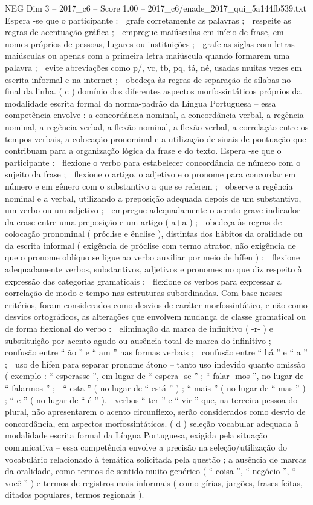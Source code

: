 \begin{textsample}{NEG Dim 3 – 2017\_c6 – Score 1.00 – 2017\_c6/enade\_2017\_qui\_5a144fb539.txt}
Espera -se que o participante :  grafe corretamente as palavras ;  respeite as regras de acentuação gráfica ;  empregue maiúsculas em início de frase, em nomes próprios de pessoas, lugares ou instituições ;  grafe as siglas com letras maiúsculas ou apenas com a primeira letra maiúscula quando formarem uma palavra ;  evite abreviações como p/, vc, tb, pq, tá, né, usadas muitas vezes em escrita informal e na internet ;  obedeça às regras de separação de sílabas no final da linha. ( c ) domínio dos diferentes aspectos morfossintáticos próprios da modalidade escrita formal da norma-padrão da Língua Portuguesa – essa competência envolve : a concordância nominal, a concordância verbal, a regência nominal, a regência verbal, a flexão nominal, a flexão verbal, a correlação entre os tempos verbais, a colocação pronominal e a utilização de sinais de pontuação que contribuam para a organização lógica da frase e do texto.
Espera -se que o participante :  flexione o verbo para estabelecer concordância de número com o sujeito da frase ;  flexione o artigo, o adjetivo e o pronome para concordar em número e em gênero com o substantivo a que se referem ;  observe a regência nominal e a verbal, utilizando a preposição adequada depois de um substantivo, um verbo ou um adjetivo ;  empregue adequadamente o acento grave indicador da crase entre uma preposição e um artigo ( a+a ) ;  obedeça às regras de colocação pronominal ( próclise e ênclise ), distintas dos hábitos da oralidade ou da escrita informal ( exigência de próclise com termo atrator, não exigência de que o pronome oblíquo se ligue ao verbo auxiliar por meio de hífen ) ;  flexione adequadamente verbos, substantivos, adjetivos e pronomes no que diz respeito à expressão das categorias gramaticais ;  flexione os verbos para expressar a correlação de modo e tempo nas estruturas subordinadas.
Com base nesses critérios, foram considerados como desvios de caráter morfossintático, e não como desvios ortográficos, as alterações que envolvem mudança de classe gramatical ou de forma flexional do verbo :  eliminação da marca de infinitivo ( -r- ) e substituição por acento agudo ou ausência total de marca do infinitivo ;  confusão entre “ ão ” e “ am ” nas formas verbais ;  confusão entre “ há ” e “ a ” ;  uso de hífen para separar pronome átono – tanto uso indevido quanto omissão ( exemplo : “ esperasse ”, em lugar de “ espera -se ” ; “ falar -mos ”, no lugar de “ falarmos ” ;  “ esta ” ( no lugar de “ está ” ) ; “ mais ” ( no lugar de “ mas ” ) ; “ e ” ( no lugar de “ é ” ).  verbos “ ter ” e “ vir ” que, na terceira pessoa do plural, não apresentarem o acento circunflexo, serão considerados como desvio de concordância, em aspectos morfossintáticos. ( d ) seleção vocabular adequada à modalidade escrita formal da Língua Portuguesa, exigida pela situação comunicativa – essa competência envolve a precisão na seleção/utilização do vocabulário relacionado à temática solicitada pela questão ; a ausência de marcas da oralidade, como termos de sentido muito genérico ( “ coisa ”, “ negócio ”, “ você ” ) e termos de registros mais informais ( como gírias, jargões, frases feitas, ditados populares, termos regionais ).

\end{textsample}
